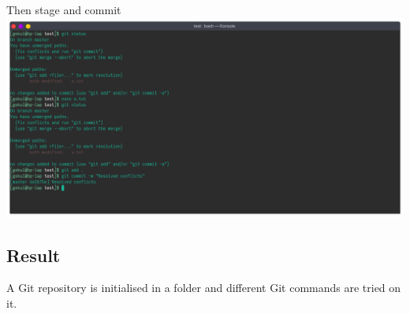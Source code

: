 \documentclass{article}
\begin{document}
\newline
Then stage and commit\newline
\includegraphics[width=1.2\textwidth]{img/p27/ss6.png}
\newpage
\subsection{Result}
A Git repository is initialised in a folder and different Git commands are tried
on it.
\end{document}
